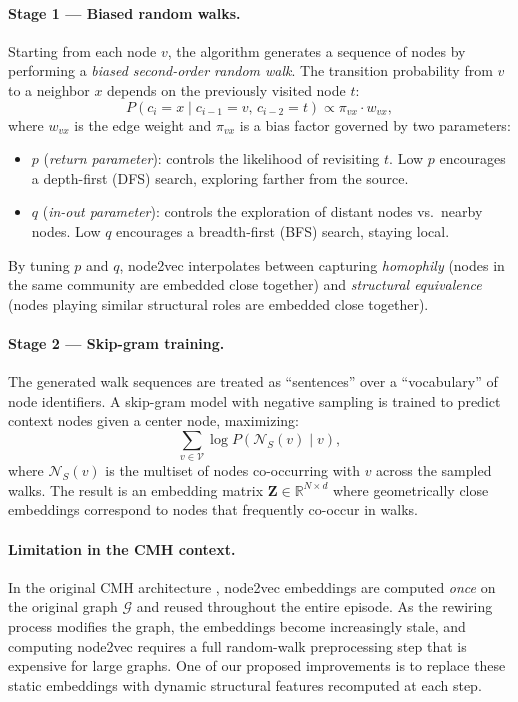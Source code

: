 \documentclass[11pt,a4paper,twoside]{tesis}
\newcommand{\G}{\mathcal{G}}
\newcommand{\V}{\mathcal{V}}
\begin{document}
\paragraph{Stage 1 — Biased random walks.}
Starting from each node $v$, the algorithm generates a sequence of nodes by performing
a \emph{biased second-order random walk}. The transition probability from $v$ to a
neighbor $x$ depends on the previously visited node $t$:
\[
P(c_i = x \mid c_{i-1} = v,\, c_{i-2} = t) \propto \pi_{vx} \cdot w_{vx},
\]
where $w_{vx}$ is the edge weight and $\pi_{vx}$ is a bias factor governed by two
parameters:
\begin{itemize}
    \item $p$ (\emph{return parameter}): controls the likelihood of revisiting $t$.
      Low $p$ encourages a depth-first (DFS) search, exploring farther from the source.
    \item $q$ (\emph{in-out parameter}): controls the exploration of distant nodes vs.\
      nearby nodes. Low $q$ encourages a breadth-first (BFS) search, staying local.
\end{itemize}
By tuning $p$ and $q$, node2vec interpolates between capturing \emph{homophily}
(nodes in the same community are embedded close together) and
\emph{structural equivalence} (nodes playing similar structural roles are embedded close
together).

\paragraph{Stage 2 — Skip-gram training.}
The generated walk sequences are treated as ``sentences'' over a ``vocabulary'' of node
identifiers. A skip-gram model \cite{mikolov2013word2vec} with negative sampling is
trained to predict context nodes given a center node, maximizing:
\[
\sum_{v \in \V} \log P\!\left(\mathcal{N}_S(v) \mid v\right),
\]
where $\mathcal{N}_S(v)$ is the multiset of nodes co-occurring with $v$ across the
sampled walks. The result is an embedding matrix $\mathbf{Z} \in \mathbb{R}^{N \times d}$
where geometrically close embeddings correspond to nodes that frequently co-occur in
walks.

\paragraph{Limitation in the CMH context.}
In the original CMH architecture \cite{bernini-2024}, node2vec embeddings are computed
\emph{once} on the original graph $\G$ and reused throughout the entire episode. As the
rewiring process modifies the graph, the embeddings become increasingly stale, and
computing node2vec requires a full random-walk preprocessing step that is expensive for
large graphs. One of our proposed improvements is to replace these static embeddings with
dynamic structural features recomputed at each step.
\end{document}
